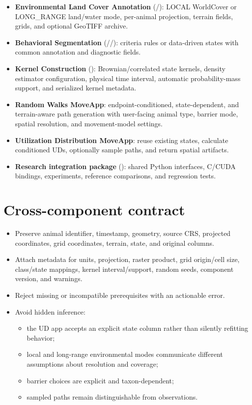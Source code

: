 \begin{itemize}
  \item \textbf{Environmental Land Cover Annotation} (/): LOCAL WorldCover or LONG\_RANGE land/water mode, per-animal projection, terrain fields, grids, and optional GeoTIFF archive.
  \item \textbf{Behavioral Segmentation} (//): criteria rules or data-driven states with common annotation and diagnostic fields.
  \item \textbf{Kernel Construction} (): Brownian/correlated state kernels, density estimator configuration, physical time interval, automatic probability-mass support, and serialized kernel metadata.
  \item \textbf{Random Walks MoveApp}: endpoint-conditioned, state-dependent, and terrain-aware path generation with user-facing animal type, barrier mode, spatial resolution, and movement-model settings.
  \item \textbf{Utilization Distribution MoveApp}: reuse existing states, calculate conditioned UDs, optionally sample paths, and return spatial artifacts.
  \item \textbf{Research integration package} (): shared Python interfaces, C/CUDA bindings, experiments, reference comparisons, and regression tests.
\end{itemize}

\section{Cross-component contract}

\begin{itemize}
  \item Preserve animal identifier, timestamp, geometry, source CRS, projected coordinates, grid coordinates, terrain, state, and original columns.
  \item Attach metadata for units, projection, raster product, grid origin/cell size, class/state mappings, kernel interval/support, random seeds, component version, and warnings.
  \item Reject missing or incompatible prerequisites with an actionable error.
  \item Avoid hidden inference:
  \begin{itemize}
    \item the UD app accepts an explicit state column rather than silently refitting behavior;
    \item local and long-range environmental modes communicate different assumptions about resolution and coverage;
    \item barrier choices are explicit and taxon-dependent;
    \item sampled paths remain distinguishable from observations.
  \end{itemize}
\end{itemize}

